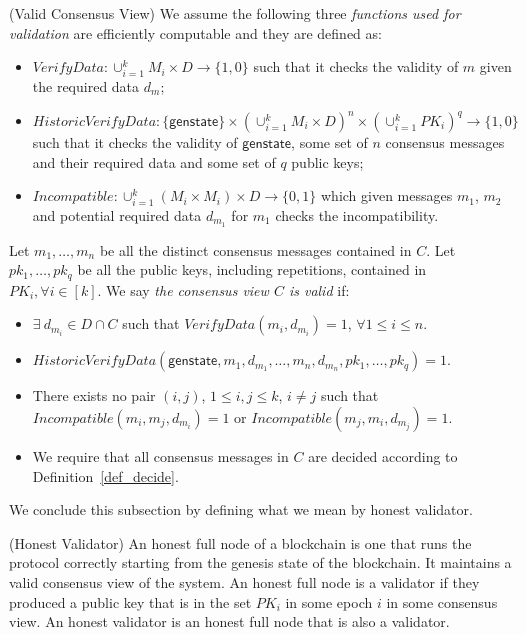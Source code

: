 \begin{definition}(Valid Consensus View)
\label{def:valid_consensus}
\noindent 
We assume the following three \emph{functions used for validation} are efficiently computable and they are defined as: 

\begin{itemize}
\item $\mathit{VerifyData}: \cup_{i=1}^k M_i \times D \rightarrow \{1, 0\}$ such that it 
checks the validity of $m$ given the required data $\mathit{d_{m}}$;
\item $\mathit{HistoricVerifyData}: \{\mathsf{genstate}\} \times (\cup_{i=1}^k M_i \times D)^n \times (\cup_{i=1}^k \mathit{PK_i})^q \rightarrow \{1, 0\}$ 
such that it checks the validity of $\mathsf{genstate}$, some set of $n$ consensus messages and their required data and some set of $q$ public keys;
\item $\mathit{Incompatible}: \cup_{i=1}^k (M_i \times M_i) \times D \rightarrow \{0,1\}$ which 
given messages $m_1$, $m_2$ and potential required data $d_{m_1}$ for $m_1$ checks the incompatibility.
\end{itemize}

\noindent Let $m_1,\ldots, m_n$ be all the distinct consensus messages contained in $C$. Let $\mathit{pk_1},\ldots, \mathit{pk_q}$ be all the 
public keys, including repetitions, contained in $\mathit{PK_i}, \forall i \in[k]$.
We say \emph{the consensus view $C$ is valid} if: 
\begin{itemize}
\item $\exists \ d_{m_i} \in D \cap C$ such that $\mathit{VerifyData}(m_i, d_{m_i}) = 1$, $\forall 1\leq i \leq n$. 
\item $\mathit{HistoricVerifyData}(\mathsf{genstate}, m_1, d_{m_1}, \ldots, m_n, d_{m_n}, \mathit{pk_1},\ldots, \mathit{pk_q}) = 1$. 
\item There exists no pair $(i,j)$, $1 \leq i,j \leq k$, $i \neq j$ such that $\mathit{Incompatible}(m_i, m_j, d_{m_i}) = 1$ 
or $\mathit{Incompatible}(m_j, m_i, d_{m_j}) = 1$.
\item We require that all consensus messages in $C$ are decided according to Definition~\ref{def_decide}.
\end{itemize}
\end{definition}

\noindent We conclude this subsection by defining what we mean by honest validator.
\begin{definition}(Honest Validator)
\label{def:honest_validator}
An honest full node of a blockchain is one that runs the protocol correctly starting from the genesis state of the blockchain. 
It maintains a valid consensus view of the system. An honest full node is a validator if they produced a public key that is in the set 
$\mathit{PK_i}$ in some epoch $i$ in some consensus view. An honest validator is an honest full node that is also a validator.
\end{definition}
 
